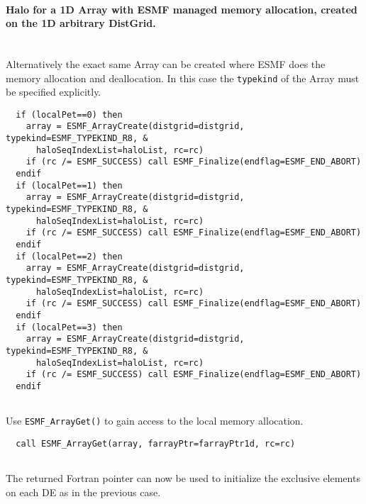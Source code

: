 
   \paragraph{Halo for a 1D Array with ESMF managed memory allocation, created on
   the 1D arbitrary DistGrid.}
   \mbox{} \\
   
   Alternatively the exact same Array can be created where ESMF does the
   memory allocation and deallocation. In this case the {\tt typekind} of the 
   Array must be specified explicitly. 

 \begin{verbatim}
  if (localPet==0) then
    array = ESMF_ArrayCreate(distgrid=distgrid, typekind=ESMF_TYPEKIND_R8, &
      haloSeqIndexList=haloList, rc=rc)
    if (rc /= ESMF_SUCCESS) call ESMF_Finalize(endflag=ESMF_END_ABORT)
  endif
  if (localPet==1) then
    array = ESMF_ArrayCreate(distgrid=distgrid, typekind=ESMF_TYPEKIND_R8, &
      haloSeqIndexList=haloList, rc=rc)
    if (rc /= ESMF_SUCCESS) call ESMF_Finalize(endflag=ESMF_END_ABORT)
  endif
  if (localPet==2) then
    array = ESMF_ArrayCreate(distgrid=distgrid, typekind=ESMF_TYPEKIND_R8, &
      haloSeqIndexList=haloList, rc=rc)
    if (rc /= ESMF_SUCCESS) call ESMF_Finalize(endflag=ESMF_END_ABORT)
  endif
  if (localPet==3) then
    array = ESMF_ArrayCreate(distgrid=distgrid, typekind=ESMF_TYPEKIND_R8, &
      haloSeqIndexList=haloList, rc=rc)
    if (rc /= ESMF_SUCCESS) call ESMF_Finalize(endflag=ESMF_END_ABORT)
  endif
 
\end{verbatim}
 

   Use {\tt ESMF\_ArrayGet()} to gain access to the local memory allocation. 

 \begin{verbatim}
  call ESMF_ArrayGet(array, farrayPtr=farrayPtr1d, rc=rc)
 
\end{verbatim}
 

   The returned Fortran pointer can now be used to initialize the exclusive
   elements on each DE as in the previous case. 

